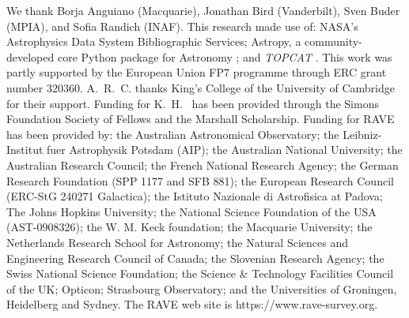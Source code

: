 \documentclass[preprint]{aastex}
\newcommand{\project}[1]{\textsl{#1}}
\begin{document}
\acknowledgements
We thank 
	Borja Anguiano (Macquarie),
	Jonathan Bird (Vanderbilt),
	Sven Buder (MPIA), 
and 
	Sofia Randich (INAF).
This research made use of: 
  	NASA's Astrophysics Data System Bibliographic Services;
  	Astropy, a community-developed core Python package for Astronomy \citep{astropy};
and 
  	\project{TOPCAT} \citep{Taylor_2005}.
This work was partly supported by the European Union FP7 programme through ERC 
grant number 320360. A.~R.~C. thanks King's College of the University of Cambridge
for their support.  Funding for K.~H.~ has been provided through the Simons 
Foundation Society of Fellows and the Marshall Scholarship.
Funding for RAVE has been provided by: the Australian Astronomical Observatory; 
the Leibniz-Institut fuer Astrophysik Potsdam (AIP); the Australian National 
University; the Australian Research Council; the French National Research Agency;
the German Research Foundation (SPP 1177 and SFB 881); the European Research 
Council (ERC-StG 240271 Galactica); the Istituto Nazionale di Astrofisica at 
Padova; The Johns Hopkins University; the National Science Foundation of the USA
(AST-0908326); the W. M. Keck foundation; the Macquarie University; the 
Netherlands Research School for Astronomy; the Natural Sciences and Engineering 
Research Council of Canada; the Slovenian Research Agency; the Swiss National 
Science Foundation; the Science \& Technology Facilities Council of the UK; 
Opticon; Strasbourg Observatory; and the Universities of Groningen, Heidelberg 
and Sydney. The RAVE web site is https://www.rave-survey.org.  
\end{document}
